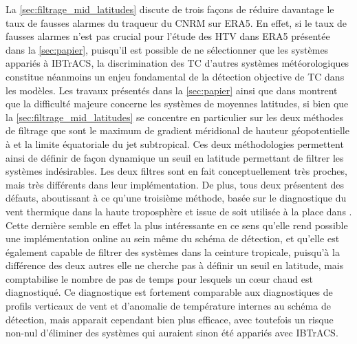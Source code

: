 \documentclass[../main.tex]{subfiles}
\begin{document}
La \cref{sec:filtrage_mid_latitudes} discute de trois façons de réduire davantage le taux de fausses alarmes du traqueur du CNRM sur ERA5. En effet, si le taux
de fausses alarmes n'est pas crucial pour l'étude des HTV dans ERA5 présentée dans la \cref{sec:papier}, puisqu'il est possible de ne sélectionner que les
systèmes appariés à IBTrACS, la discrimination des TC d'autres systèmes météorologiques constitue néanmoins un enjeu fondamental de la détection objective de TC
dans les modèles. Les travaux présentés dans la \cref{sec:papier} ainsi que dans \textcite{bourdin_intercomparison_2022} montrent que la difficulté majeure
concerne les systèmes de moyennes latitudes, si bien que la \cref{sec:filtrage_mid_latitudes} se concentre en particulier sur les deux méthodes de filtrage que
sont le maximum de gradient méridional de hauteur géopotentielle à  et la limite équatoriale du jet subtropical. Ces deux méthodologies permettent
ainsi de définir de façon dynamique un seuil en latitude permettant de filtrer les systèmes indésirables. Les deux filtres sont en fait conceptuellement très
proches, mais très différents dans leur implémentation. De plus, tous deux présentent des défauts, aboutissant à ce qu'une troisième méthode, basée sur le
diagnostique du vent thermique dans la haute troposphère et issue de \textcite{hart_cyclone_2003} soit utilisée à la place dans \textcite{dulac_assessing_2023}.
Cette dernière semble en effet la plus intéressante en ce sens qu'elle rend possible une implémentation online au sein même du schéma de détection, et qu'elle
est également capable de filtrer des systèmes dans la ceinture tropicale, puisqu'à la différence des deux autres elle ne cherche pas à définir un seuil en
latitude, mais comptabilise le nombre de pas de temps pour lesquels un cœur chaud est diagnostiqué. Ce diagnostique est fortement comparable aux diagnostiques
de profils verticaux de vent et d'anomalie de température internes au schéma de détection, mais apparait cependant bien plus efficace, avec toutefois un risque
non-nul d'éliminer des systèmes qui auraient sinon été appariés avec IBTrACS.
\end{document}
